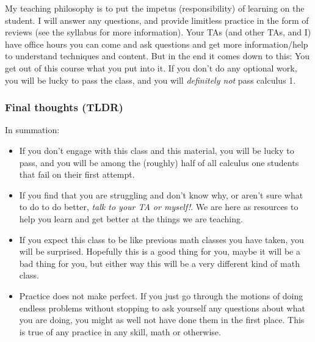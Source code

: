 My teaching philosophy is to put the impetus (responsibility) of learning on the student. I will answer any questions, and provide limitless practice in the form of reviews (see the syllabus for more information). Your TAs (and other TAs, and I) have office hours you can come and ask questions and get more information/help to understand techniques and content. But in the end it comes down to this: You get out of this course what you put into it. If you don't do any optional work, you will be lucky to pass the class, and you will \emph{definitely not} pass calculus 1.

\subsubsection{Final thoughts (TLDR)}
In summation:
\begin{itemize}
\item If you don't engage with this class and this material, you will be lucky to pass, and you will be among the (roughly) half of all calculus one students that fail on their first attempt. 
\item If you find that you are struggling and don't know why, or aren't sure what to do to do better, \emph{talk to your TA or myself!}. We are here as resources to help you learn and get better at the things we are teaching.
\item If you expect this class to be like previous math classes you have taken, you will be surprised. Hopefully this is a good thing for you, maybe it will be a bad thing for you, but either way this will be a very different kind of math class.
\item Practice does not make perfect. If you just go through the motions of doing endless problems without stopping to ask yourself any questions about what you are doing, you might as well not have done them in the first place. This is true of any practice in any skill, math or otherwise.
\end{itemize}


